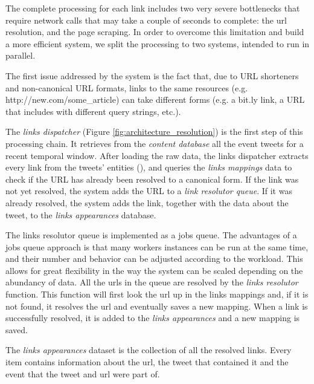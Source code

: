 \documentclass{sig-alternate}
\begin{document}
The complete processing for each link includes two very severe bottlenecks that require network calls that may take a couple of seconds to complete: the url resolution, and the page scraping. In order to overcome this limitation and build a more efficient system, we split the processing to two systems, intended to run in parallel.

The first issue addressed by the system is the fact that, due to URL shorteners and non-canonical URL formats, links to the same resources (e.g. http://new.com/some\_article) can take different forms (e.g. a bit.ly link, a URL that includes with different query strings, etc.).  

The \emph{links dispatcher} (Figure \ref{fig:architecture_resolution}) is the first step of this processing chain. It retrieves from the \emph{content database} all the event tweets for a recent temporal window. After loading the raw data, the links dispatcher extracts every link from the tweets' entities (\cite{RestTweetsDoc}), and queries the \emph{links mappings} data to check if the URL has already been resolved to a canonical form. If the link was not yet resolved, the system adds the URL to a \emph{link resolutor queue}. If it was already resolved, the system adds the link, together with the data about the tweet, to the \emph{links appearances} database. 

The links resolutor queue is implemented as a jobs queue\cite{RedisQueues}. The advantages of a jobs queue approach is that many workers instances can be run at the same time, and their number and behavior can be adjusted according to the workload. This allows for great flexibility in the way the system can be scaled depending on the abundancy of data.
All the urls in the queue are resolved by the \emph{links resolutor} function. This function will first look the url up in the links mappings and, if it is not found, it resolves the url and eventually saves a new mapping. When a link is successfully resolved, it is added to the \emph{links appearances} and a new mapping is saved.

The \emph{links appearances} dataset is the collection of all the resolved links. Every item contains information about the url, the tweet that contained it and the event that the tweet and url were part of. %
\end{document}
